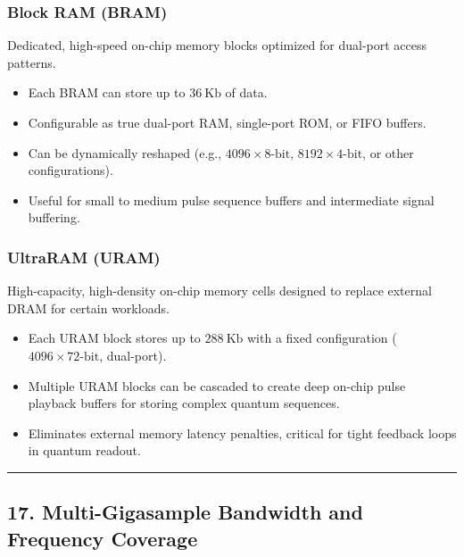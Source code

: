 \documentclass[
]{article}
\providecommand{\tightlist}{%
  \setlength{\itemsep}{0pt}\setlength{\parskip}{0pt}}
\begin{document}
\subsubsection{Block RAM (BRAM)}\label{block-ram-bram}

Dedicated, high-speed on-chip memory blocks optimized for dual-port
access patterns.

\begin{itemize}
\tightlist
\item
  Each BRAM can store up to \(36\ \text{Kb}\) of data.
\item
  Configurable as true dual-port RAM, single-port ROM, or FIFO buffers.
\item
  Can be dynamically reshaped (e.g., \(4096 \times 8\text{-bit}\),
  \(8192 \times 4\text{-bit}\), or other configurations).
\item
  Useful for small to medium pulse sequence buffers and intermediate
  signal buffering.
\end{itemize}

\subsubsection{UltraRAM (URAM)}\label{ultraram-uram}

High-capacity, high-density on-chip memory cells designed to replace
external DRAM for certain workloads.

\begin{itemize}
\tightlist
\item
  Each URAM block stores up to \(288\ \text{Kb}\) with a fixed
  configuration (\(4096 \times 72\text{-bit}\), dual-port).
\item
  Multiple URAM blocks can be cascaded to create deep on-chip pulse
  playback buffers for storing complex quantum sequences.
\item
  Eliminates external memory latency penalties, critical for tight
  feedback loops in quantum readout.
\end{itemize}

\begin{center}\rule{0.5\linewidth}{0.5pt}\end{center}

\subsection{17. Multi-Gigasample Bandwidth and Frequency
Coverage}\label{multi-gigasample-bandwidth-and-frequency-coverage}
\end{document}
